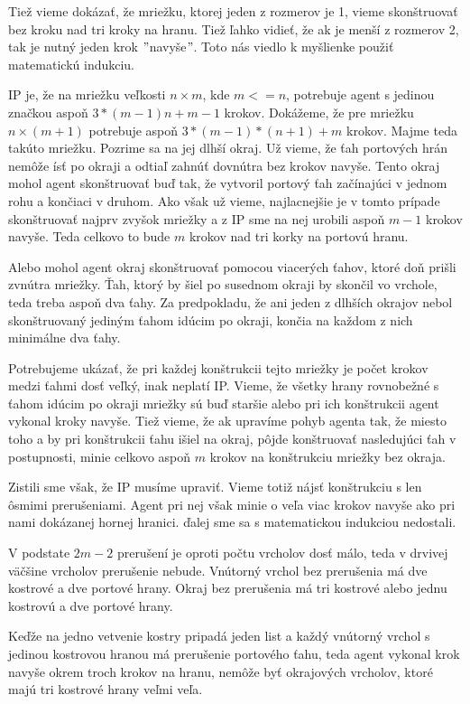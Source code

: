 Tiež vieme dokázať, že mriežku, ktorej jeden z rozmerov je 1, vieme
skonštruovať bez kroku nad tri kroky na hranu. Tiež ľahko vidieť, že ak je
menší z rozmerov 2, tak je nutný jeden krok $"$navyše$"$. Toto nás viedlo k
myšlienke použiť matematickú indukciu.

IP je, že na mriežku veľkosti $n \times m$, kde $m <= n$, potrebuje agent s
jedinou značkou aspoň $3*(m-1)n + m - 1$ krokov. Dokážeme, že pre mriežku 
$n
\times (m + 1)$ potrebuje aspoň $3*(m-1)*(n+1) + m$ krokov. Majme teda takúto mriežku.
Pozrime sa na jej dlhší okraj. Už vieme, že ťah portových hrán nemôže ísť po
okraji a odtiaľ zahnúť dovnútra bez krokov navyše. Tento okraj mohol agent
skonštruovať buď tak, že vytvoril portový ťah začínajúci v jednom rohu a
končiaci v druhom. Ako však už vieme, najlacnejšie je v tomto prípade
skonštruovať najprv zvyšok mriežky a z IP sme na nej urobili aspoň $m - 1$
krokov navyše. Teda celkovo to bude $m$ krokov nad tri korky na portovú
hranu.

Alebo mohol agent okraj skonštruovať
pomocou viacerých ťahov, ktoré doň prišli zvnútra mriežky. Ťah, ktorý by šiel
po susednom okraji by skončil vo vrchole, teda treba aspoň dva ťahy. Za
predpokladu, že ani jeden z dlhších okrajov nebol skonštruovaný jediným
ťahom idúcim po okraji, končia na každom z nich minimálne dva ťahy.

Potrebujeme ukázať, že pri každej konštrukcii tejto mriežky je počet krokov
medzi ťahmi dosť veľký, inak neplatí IP. Vieme, že všetky hrany rovnobežné s
ťahom idúcim po okraji mriežky sú buď staršie alebo pri ich konštrukcii
agent vykonal kroky navyše. Tiež vieme, že ak 
upravíme pohyb agenta tak, že miesto toho a by pri konštrukcii ťahu išiel na
okraj, pôjde konštruovať nasledujúci ťah v postupnosti, minie celkovo 
aspoň $m$ krokov na konštrukciu mriežky bez okraja.

Zistili sme však, že IP musíme upraviť. Vieme totiž nájsť konštrukciu s len
ôsmimi prerušeniami. Agent pri nej však minie o veľa viac krokov navyše ako
pri nami dokázanej hornej hranici. ďalej sme sa s matematickou indukciou
nedostali.

V podstate $2 m - 2$ prerušení je oproti počtu vrcholov dosť málo, teda v
drvivej väčšine vrcholov prerušenie nebude. Vnútorný vrchol bez prerušenia má dve
kostrové a dve portové hrany. Okraj bez prerušenia má tri kostrové alebo
jednu kostrovú a dve portové hrany. 

Keďže na jedno vetvenie kostry pripadá jeden list a každý vnútorný vrchol s
jedinou kostrovou hranou má prerušenie portového ťahu, teda agent vykonal
krok navyše okrem troch krokov na hranu, nemôže byť okrajových vrcholov,
ktoré majú tri kostrové hrany veľmi veľa.

